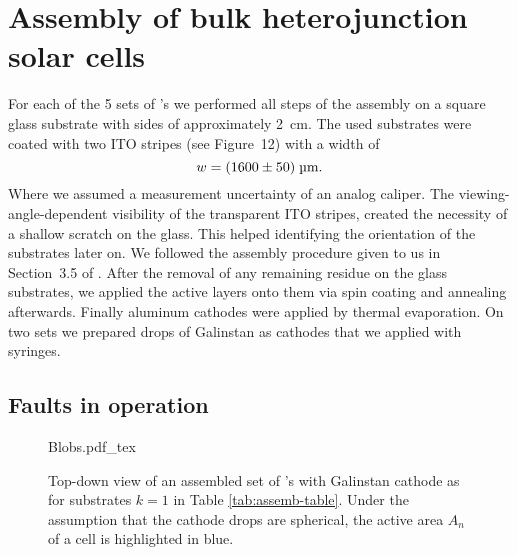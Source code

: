 \section{Assembly of bulk heterojunction solar cells}\label{sec:assembly}
For each of the 5 sets of \BHSC's we performed all steps of the assembly on a square glass substrate with sides of approximately 2~cm. The used substrates were coated with two ITO stripes (see \cite{labdesc} Figure~12) with a width of
\begin{equation*}
w = (1600\pm50)\;\text{\textmu m}.
\end{equation*}
Where we assumed a measurement uncertainty of an analog caliper. The viewing-angle-dependent visibility of the transparent ITO stripes, created the necessity of a shallow scratch on the glass. This helped identifying the orientation of the substrates later on.\mypar
We followed the assembly procedure given to us in Section~3.5 of \cite{labdesc}. After the removal of any remaining residue on the glass substrates, we applied the active layers onto them via spin coating and annealing afterwards. Finally aluminum cathodes were applied by thermal evaporation. On two sets we prepared drops of Galinstan as cathodes that we applied with syringes.

\subsection{Faults in operation}

\begin{figure}[h]\centering
{Blobs.pdf_tex}
\caption{Top-down view of an assembled set of \BHSC's with Galinstan cathode as for substrates $k=1$ in Table \ref{tab:assemb-table}. Under the assumption that the cathode drops are spherical, the active area $A_n$ of a cell is highlighted in blue.}
\label{fig:blobs}
\end{figure}


